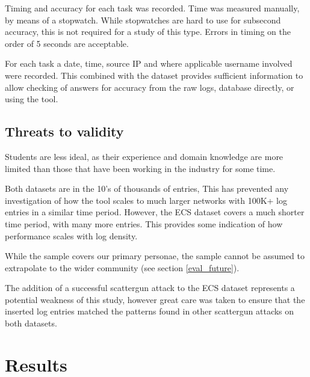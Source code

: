 Timing and accuracy for each task was recorded. 
Time was measured manually, by means of a stopwatch. While stopwatches are hard to use for subsecond accuracy, this is not required for a study of this type. Errors in timing on the order of 5 seconds are acceptable.

For each task a date, time, source IP and where applicable username involved were recorded. This combined with the dataset provides sufficient information to allow checking of answers for accuracy from the raw logs, database directly, or using the tool. 

\subsection{Threats to validity}
 Students are less ideal, as their experience and domain knowledge are more limited than those that have been working in the industry for some time.
 
Both datasets are in the 10's of thousands of entries, This has prevented any investigation of how the tool scales to much larger networks with 100K+ log entries in a similar time period. However, the ECS dataset covers a much shorter time period, with many more entries. This provides some indication of how performance scales with log density.
 
While the sample covers our primary personae, the sample cannot be assumed to extrapolate to the wider community (see section \ref{eval_future}).

The addition of a successful scattergun attack to the ECS dataset represents a potential weakness of this study, however great care was taken to ensure that the inserted log entries matched the patterns found in other scattergun attacks on both datasets. 

\section{Results}\label{res_res}

